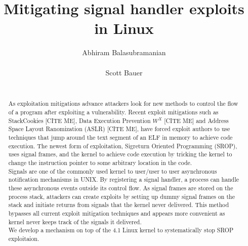 \documentclass{sig-alternate-05-2015}
\begin{document}
\title{Mitigating signal handler exploits in Linux
}
\author{
\alignauthor
Abhiram Balasubramanian\\
       \\
\alignauthor
Scott Bauer\\
       \\
}

\maketitle
\begin{abstract}
As exploitation mitigations advance attackers look for new methods to control the flow of a program after exploiting a vulnerability. Recent exploit mitigations such as StackCookies [CITE ME], Data Execution Prevention \(W^X\) [CITE ME] and Address Space Layout Ranomization (ASLR) [CITE ME], have forced exploit authors to use techniques that jump around the text segment of an ELF in memory to achieve code execution. The newest form of exploitation, Sigreturn Oriented Programming (SROP), uses signal frames, and the kernel to achieve code execution by tricking the kernel to change the instruction pointer to some arbitrary location in the code.\\
Signals are one of the commonly used kernel to user/user to user asynchronous notification mechanisms in UNIX. By registering a signal handler, a process can handle these asynchronous events outside its control flow. As signal frames are stored on the process stack, attackers can create exploits by setting up dummy signal frames on the stack and initiate returns from signals that the kernel never delivered. This method bypasses all current exploit mitigation techniques and  appears more convenient as kernel never keeps track of the signals it delivered.\\
We develop a mechanism on top of the 4.1 Linux kernel to systematically stop SROP exploitaion.

\end{abstract}
\end{document}
